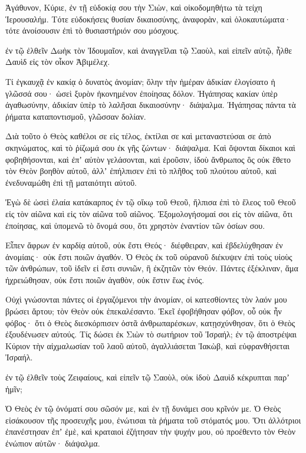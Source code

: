 \begin{spacing}{1.1}
\begin{multicols}{2}
Ἀγάθυνον, Κύριε, ἐν τῇ εὐδοκίᾳ σου τὴν Σιὼν, καὶ οἰκοδομηθήτω τὰ τείχη Ἱερουσαλήμ.
Τότε εὐδοκήσεις θυσίαν δικαιοσύνης, ἀναφορὰν, καὶ ὁλοκαυτώματα· τότε ἀνοίσουσιν ἐπὶ τὸ θυσιαστήριόν σου μόσχους.

ἐν τῷ ἐλθεῖν Δωὴκ τὸν Ἰδουμαῖον, καὶ ἀναγγεῖλαι τῷ Σαοὺλ, καὶ εἰπεῖν αὐτῷ, ἦλθε Δαυὶδ εἰς τὸν οἶκον Ἀβιμέλεχ.

Τί ἐγκαυχᾷ ἐν κακίᾳ ὁ δυνατὸς ἀνομίαν; ὅλην τὴν ἡμέραν
ἀδικίαν ἐλογίσατο ἡ γλῶσσά σου· ὡσεὶ ξυρὸν ἠκονημένον ἐποίησας δόλον.
Ἠγάπησας κακίαν ὑπὲρ ἀγαθωσύνην, ἀδικίαν ὑπὲρ τὸ λαλῆσαι δικαιοσύνην· διάψαλμα.
Ἠγάπησας πάντα τὰ ῥήματα καταποντισμοῦ, γλῶσσαν δολίαν.

Διὰ τοῦτο ὁ Θεὸς καθέλοι σε εἰς τέλος, ἐκτίλαι σε καὶ μεταναστεύσαι σε ἀπὸ σκηνώματος, καὶ τὸ ῥίζωμά σου ἐκ γῆς ζώντων· διάψαλμα.
Καὶ ὄψονται δίκαιοι καὶ φοβηθήσονται, καὶ ἐπʼ αὐτὸν γελάσονται, καὶ ἐροῦσιν,
ἰδοὺ ἄνθρωπος ὃς οὐκ ἔθετο τὸν Θεὸν βοηθὸν αὐτοῦ, ἀλλʼ ἐπήλπισεν ἐπὶ τὸ πλῆθος τοῦ πλούτου αὐτοῦ, καὶ ἐνεδυναμώθη ἐπὶ τῇ ματαιότητι αὐτοῦ.

Ἐγὼ δὲ ὡσεὶ ἐλαία κατάκαρπος ἐν τῷ οἴκῳ τοῦ Θεοῦ, ἤλπισα ἐπὶ τὸ ἔλεος τοῦ Θεοῦ εἰς τὸν αἰῶνα καὶ εἰς τὸν αἰῶνα τοῦ αἰῶνος.
Ἐξομολογήσομαί σοι εἰς τὸν αἰῶνα, ὅτι ἐποίησας, καὶ ὑπομενῶ τὸ ὄνομά σου, ὅτι χρηστὸν ἐναντίον τῶν ὁσίων σου.

Εἶπεν ἄφρων ἐν καρδίᾳ αὐτοῦ, οὐκ ἔστι Θεός· διέφθειραν, καὶ ἐβδελύχθησαν ἐν ἀνομίαις· οὐκ ἔστι ποιῶν ἀγαθόν.
Ὁ Θεὸς ἐκ τοῦ οὐρανοῦ διέκυψεν ἐπὶ τοὺς υἱοὺς τῶν ἀνθρώπων, τοῦ ἰδεῖν εἰ ἔστι συνιῶν, ἢ ἐκζητῶν τὸν Θεόν.
Πάντες ἐξέκλιναν, ἅμα ἠχρειώθησαν, οὐκ ἔστι ποιῶν ἀγαθὸν, οὐκ ἔστιν ἕως ἑνός.

Οὐχὶ γνώσονται πάντες οἱ ἐργαζόμενοι τὴν ἀνομίαν, οἱ κατεσθίοντες τὸν λαόν μου βρώσει ἄρτου; τὸν Θεὸν οὐκ ἐπεκαλέσαντο.
Ἐκεῖ ἐφοβήθησαν φόβον, οὗ οὐκ ἦν φόβος· ὅτι ὁ Θεὸς διεσκόρπισεν ὀστᾶ ἀνθρωπαρέσκων, κατῃσχύνθησαν, ὅτι ὁ Θεὸς ἐξουδένωσεν αὐτούς.
Τίς δώσει ἐκ Σιὼν τὸ σωτήριον τοῦ Ἰσραήλ; ἐν τῷ ἀποστρέψαι Κύριον τὴν αἰχμαλωσίαν τοῦ λαοῦ αὐτοῦ, ἀγαλλιάσεται Ἰακὼβ, καὶ εὐφρανθήσεται Ἰσραήλ.

ἐν τῷ ἐλθεῖν τοὺς Ζειφαίους, καὶ εἰπεῖν τῷ Σαοὺλ, οὐκ ἰδοὺ Δαυὶδ κέκρυπται παρʼ ἡμῖν;

Ὁ Θεὸς ἐν τῷ ὀνόματί σου σῶσόν με, καὶ ἐν τῇ δυνάμει σου κρῖνόν με.
Ὁ Θεὸς εἰσάκουσον τῆς προσευχῆς μου, ἐνώτισαι τὰ ῥήματα τοῦ στόματός μου.
Ὅτι ἀλλότριοι ἐπανέστησαν ἐπʼ ἐμὲ, καὶ κραταιοὶ ἐζήτησαν τὴν ψυχήν μου, οὐ προέθεντο τὸν Θεὸν ἐνώπιον αὐτῶν· διάψαλμα.


\end{multicols}
\end{spacing}
